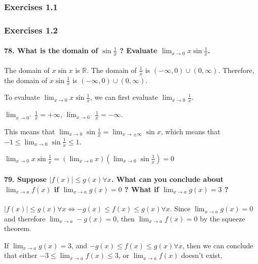 \subsubsection{Exercises 1.1}
\subsubsection{Exercises 1.2}

\paragraph{78. What is the domain of $\sin \frac{1}{x}$ ? Evaluate $\lim_{x\rightarrow 0} x\sin \frac{1}{x}$.}

The domain of $x\sin x$ is $\mathbb{R}$. The domain of $\frac{1}{x}$ is $(-\infty, 0)\cup(0, \infty)$. Therefore, the domain of $x\sin \frac{1}{x}$ is $(-\infty, 0)\cup(0, \infty)$.

To evaluate $\lim_{x\rightarrow 0} x\sin \frac{1}{x}$, we can first evaluate $\lim_{x\rightarrow 0} \frac{1}{x}$. 

$\lim_{x\rightarrow 0^+} \frac{1}{x} = +\infty$, $\lim_{x\rightarrow 0^-} \frac{1}{x} = -\infty$. 

This means that $\lim_{x\rightarrow 0} \sin \frac{1}{x} = \lim_{x\rightarrow \pm\infty} \sin x$, which means that $-1 \leq \lim_{x\rightarrow 0} \sin \frac{1}{x} \leq 1$.

$\lim_{x\rightarrow 0} x\sin \frac{1}{x} = (\lim_{x\rightarrow 0} x)(\lim_{x\rightarrow 0} \sin \frac{1}{x}) = 0$ 

\paragraph{79. Suppose $|f(x)| \leq g(x) \forall x$. What can you conclude about $\lim_{x\rightarrow a} f(x)$ if $\lim_{x\rightarrow a} g(x) = 0$ ? What if $\lim_{x\rightarrow a} g(x) = 3$ ?}

$|f(x)| \leq g(x) \forall x \Leftrightarrow -g(x) \leq f(x) \leq g(x) \forall x$. Since $\lim_{x\rightarrow a} g(x) = 0$ and therefore $\lim_{x\rightarrow a} -g(x) = 0$, then $\lim_{x\rightarrow a} f(x) = 0$ by the squeeze theorem.

If $\lim_{x\rightarrow a} g(x) = 3$, and $-g(x) \leq f(x) \leq g(x) \forall x$, then we can conclude that either $-3 \leq \lim_{x\rightarrow a} f(x) \leq 3$, or $\lim_{x\rightarrow a} f(x)$ doesn't exist.









